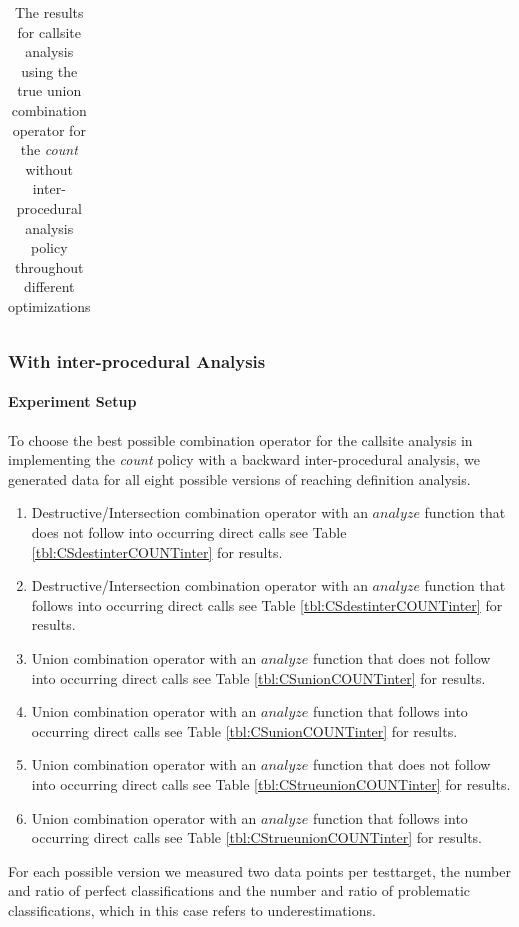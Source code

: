 \begin{table}[!htbp]
{\begin{tabular}{|c|c}
    	\end{tabular}
}
		\caption {The results for callsite analysis using the true union combination operator for the \textit{count} without inter-procedural analysis policy throughout different optimizations}
		\label{tbl:CStrueunionCOUNTnointer}
\end{table}

\newpage

\subsubsection{With inter-procedural Analysis}

\paragraph{Experiment Setup}
To choose the best possible combination operator for the callsite analysis in implementing the \textit{count} policy with a backward inter-procedural analysis, we generated data for all eight possible versions of reaching definition analysis.
\begin{enumerate}
\item Destructive/Intersection combination operator with an $analyze$ function that does not follow into occurring direct calls see Table \ref{tbl:CSdestinterCOUNTinter} for results.
\item Destructive/Intersection combination operator with an $analyze$ function that follows into occurring direct calls see Table \ref{tbl:CSdestinterCOUNTinter} for results.
\item Union combination operator with an $analyze$ function that does not follow into occurring direct calls see Table \ref{tbl:CSunionCOUNTinter} for results.
\item Union combination operator with an $analyze$ function that follows into occurring direct calls see Table \ref{tbl:CSunionCOUNTinter} for results.
\item Union combination operator with an $analyze$ function that does not follow into occurring direct calls see Table \ref{tbl:CStrueunionCOUNTinter} for results.
\item Union combination operator with an $analyze$ function that follows into occurring direct calls see Table \ref{tbl:CStrueunionCOUNTinter} for results.
\end{enumerate}
For each possible version we measured two data points per testtarget, the number and ratio of perfect classifications and the number and ratio of problematic classifications, which in this case refers to underestimations.

